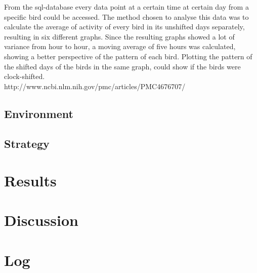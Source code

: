 \documentclass[a4paper]{article}
\begin{document}
From the sql-database every data point at a certain time at certain day from a specific bird could be accessed. The method chosen to analyse this data was to calculate the average of activity of every bird in its unshifted days separately, resulting in six different graphs. Since the resulting graphs showed a lot of variance from hour to hour, a moving average of five hours was calculated, showing a better perspective of the pattern of each bird. Plotting the pattern of the shifted days of the birds in the same graph, could show if the birds were clock-shifted.\\
http://www.ncbi.nlm.nih.gov/pmc/articles/PMC4676707/\\

\subsection*{Environment}

\subsection*{Strategy}
\section*{Results}
\section*{Discussion}
\section*{Log}
\end{document}
